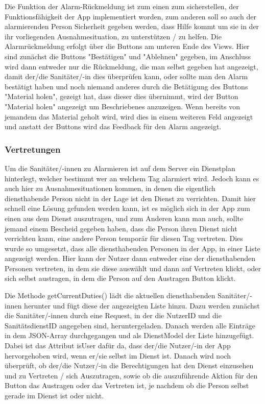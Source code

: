     Die Funktion der Alarm-Rückmeldung ist zum einen zum sicherstellen, der
    Funktionsfähigkeit der App implementiert worden, zum anderen soll so auch der 
    alarmierenden Person Sicherheit gegeben werden, dass Hilfe kommt um sie in der 
    ihr vorliegenden Ausnahmesituation, zu unterstützen / zu helfen.
    Die Alarmrückmeldung erfolgt über die Buttons am unteren Ende des Views. Hier 
    sind zunächst die Buttons "Bestätigen" und "Ablehnen" gegeben, im Anschluss wird 
    dann entweder nur die Rückmeldung, die man selbst gegeben hat angezeigt, damit 
    der/die Sanitäter/-in dies überprüfen kann, oder sollte man den Alarm bestätigt 
    haben und noch niemand anderes durch die Betätigung des Buttons "Material holen", 
    gezeigt hat, dass dieser dies übernimmt, wird der Button "Material holen" 
    angezeigt um Beschriebenes anzuzeigen. Wenn bereits von jemandem das Material 
    geholt wird, wird dies in einem weiteren Feld angezeigt und anstatt der Buttons 
    wird das Feedback für den Alarm angezeigt.

\subsubsection{Vertretungen}
    Um die Sanitäter/-innen zu Alarmieren ist auf dem Server ein Dienstplan hinterlegt, 
    welcher bestimmt wer an welchem Tag alarmiert wird. Jedoch kann es auch hier zu 
    Ausnahmesituationen kommen, in denen die eigentlich diensthabende Person nicht in 
    der Lage ist den Dienst zu verrichten. Damit hier schnell eine Lösung gefunden 
    werden kann, ist es möglich sich in der App zum einen aus dem Dienst auszutragen,
    und zum Anderen kann man auch, sollte jemand einem Bescheid gegeben haben, dass
    die Person ihren Dienst nicht verrichten kann, eine andere Person temporär für 
    diesen Tag vertreten. Dies wurde so umgesetzt, dass alle diensthabenden Personen
    in der App, in einer Liste angezeigt werden. Hier kann der Nutzer dann entweder 
    eine der diensthabenden Personen vertreten, in dem sie diese auswählt und dann 
    auf Vertreten klickt, oder sich selbst austragen, in dem die Person auf den 
    \glqq Austragen \grqq Button klickt.

    Die Methode getCurrentDuties() lädt die aktuellen diensthabenden Sanitäter/-innen 
    herunter und fügt diese der angezeigten Liste hinzu. Dazu werden zunächst die 
    Sanitäter/-innen durch eine Request, in der die NutzerID und die SanitätsdienstID
    angegeben sind, heruntergeladen. Danach werden alle Einträge in dem JSON-Array 
    durchgegangen und als DienstModel der Liste hinzugefügt. Dabei ist das Attribut 
    isUser dafür da, dass der/die Nutzer/-in der App hervorgehoben wird, wenn er/sie 
    selbst im Dienst ist. Danach wird noch überprüft, ob der/die Nutzer/-in die 
    Berechtigungen hat den Dienst einzusehen und zu Vertreten / sich Auszutragen, sowie
    ob die auszuführende Aktion für den Button das Austragen oder das Vertreten ist, 
    je nachdem ob die Person selbst gerade im Dienst ist oder nicht.

